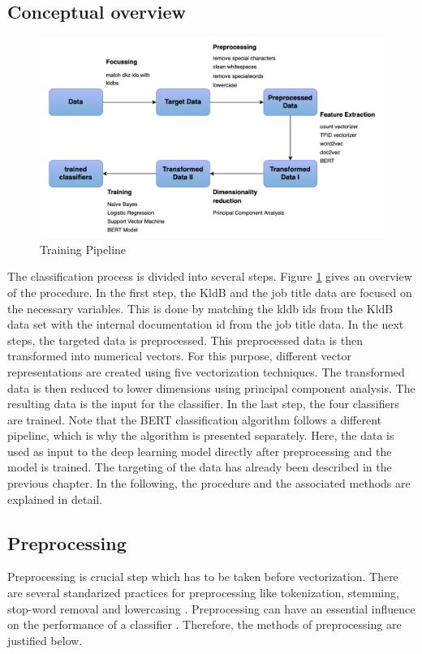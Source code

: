 \documentclass[12pt, a4paper, titlepage]{article}
\begin{document}
\subsection{Conceptual overview}

\begin{figure}[]
  \center
  \includegraphics[scale=0.5]{pipeline_MA.png}
  \caption{\label{fig: F8} Training Pipeline}
\end{figure}

The classification process is divided into several steps. Figure \ref{fig: F8} gives an overview of the procedure. In the first step, the \ac{KldB} and the job title data are focused on the necessary variables. This is done by matching the kldb ids from the \ac{KldB} data set with the internal documentation id from the job title data. In the next steps, the targeted data is preprocessed. This preprocessed data is then transformed into numerical vectors. For this purpose, different vector representations are created using five vectorization techniques. The transformed data is then reduced to lower dimensions using principal component analysis. The resulting data is the input for the classifier. In the last step, the four classifiers are trained. Note that the BERT classification algorithm follows a different pipeline, which is why the algorithm is presented separately. Here, the data is used as input to the deep learning model directly after preprocessing and the model is trained. The targeting of the data has already been described in the previous chapter. In the following, the procedure and the associated methods are explained in detail. 

\subsection{Preprocessing}
Preprocessing is crucial step which has to be taken before vectorization. There are several standarized practices for preprocessing like tokenization, stemming, stop-word removal and lowercasing \citep{alsmadi2019}. Preprocessing can have an essential influence on the performance of a classifier \citep{uysal2014, hacohen2020, gonccalves2005}. Therefore, the methods of preprocessing are justified below.
\end{document}
